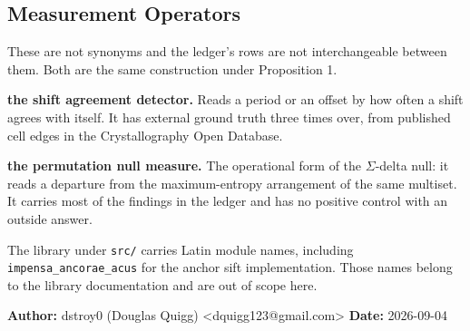 \subsection{Measurement Operators}

These are not synonyms and the ledger's rows are not interchangeable between them. Both are the same construction under Proposition 1.

\textbf{the shift agreement detector.} Reads a period or an offset by how often a shift agrees with itself. It has external ground truth three times over, from published cell edges in the Crystallography Open Database.

\textbf{the permutation null measure.} The operational form of the \(\Sigma\)-delta null: it reads a departure from the maximum-entropy arrangement of the same multiset. It carries most of the findings in the ledger and has no positive control with an outside answer.

The library under \texttt{src/\allowbreak{}} carries Latin module names, including \texttt{impensa\_\allowbreak{}ancorae\_\allowbreak{}acus} for the anchor sift implementation. Those names belong to the library documentation and are out of scope here.

\textbf{Author:} dstroy0 (Douglas Quigg) <dquigg123@gmail.com> \textbf{Date:} 2026-09-04

